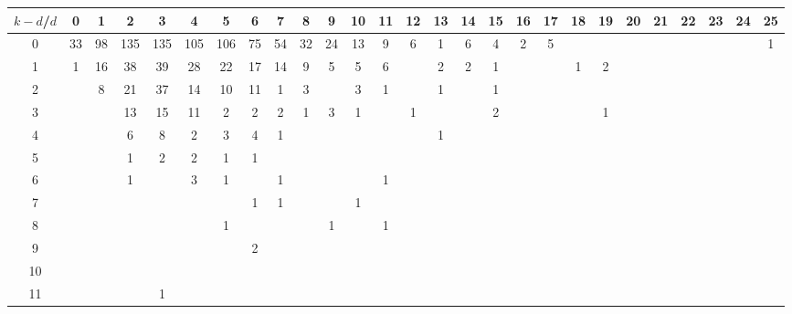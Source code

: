 \documentclass{article}[12pt]
\begin{document}
\begin{landscape}

\begin{table}[h]\footnotesize
{\centering
\begin{tabular}{|c|c|
c|c|c|c|c|c|c|c|c|c|c|c|c|c|c|c|c|c|c|c|c|c|c|c|c|}
  \hline
  $k-d$/$d$ 
 & 0 & 1 & 2 & 3 & 4 & 5 & 6 & 7 & 8 & 9 & 10 & 11 & 12 & 13 & 14 & 15 & 16 & 17 & 18 & 19 & 20 & 21 & 22 & 23 & 24 & 25\\

  \hline
  \hline

0  & 33 & 98 & 135 & 135 & 105 & 106 & 75 & 54 & 32 & 24 & 13 & 9 & 6 & 1 & 6 & 4 & 2 & 5 &  &  &  &  &  &  &  & 1\\

1  & 1 & 16 & 38 & 39 & 28 & 22 & 17 & 14 & 9 & 5 & 5 & 6 &  & 2 & 2 & 1 &  &  & 1 & 2 &  &  &  &  &  & \\

2  &  & 8 & 21 & 37 & 14 & 10 & 11 & 1 & 3 &  & 3 & 1 &  & 1 &  & 1 &  &  &  &  &  &  &  &  &  & \\

3  &  &  & 13 & 15 & 11 & 2 & 2 & 2 & 1 & 3 & 1 &  & 1 &  &  & 2 &  &  &  & 1 &  &  &  &  &  & \\

4  &  &  & 6 & 8 & 2 & 3 & 4 & 1 &  &  &  &  &  & 1 &  &  &  &  &  &  &  &  &  &  &  & \\

5  &  &  & 1 & 2 & 2 & 1 & 1 &  &  &  &  &  &  &  &  &  &  &  &  &  &  &  &  &  &  & \\

6  &  &  & 1 &  & 3 & 1 &  & 1 &  &  &  & 1 &  &  &  &  &  &  &  &  &  &  &  &  &  & \\

7  &  &  &  &  &  &  & 1 & 1 &  &  & 1 &  &  &  &  &  &  &  &  &  &  &  &  &  &  & \\

8  &  &  &  &  &  & 1 &  &  &  & 1 &  & 1 &  &  &  &  &  &  &  &  &  &  &  &  &  & \\

9  &  &  &  &  &  &  & 2 &  &  &  &  &  &  &  &  &  &  &  &  &  &  &  &  &  &  & \\

10  &  &  &  &  &  &  &  &  &  &  &  &  &  &  &  &  &  &  &  &  &  &  &  &  &  & \\

11  &  &  &  & 1 &  &  &  &  &  &  &  &  &  &  &  &  &  &  &  &  &  &  &  &  &  & \\


\end{tabular}}
\end{table}
\end{landscape}
\end{document}
